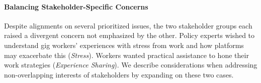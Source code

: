 
\paragraph{{Balancing Stakeholder-Specific Concerns}}
{Despite alignments on several prioritized issues, the two stakeholder groups each raised a divergent concern not emphasized by the other.
Policy experts wished to understand gig workers' experiences with stress from work and how platforms may exacerbate this (\textit{Stress}). Workers wanted practical assistance to hone their work strategies (\textit{Experience Sharing}). We describe considerations when addressing non-overlapping interests of stakeholders by expanding on these two cases.}


